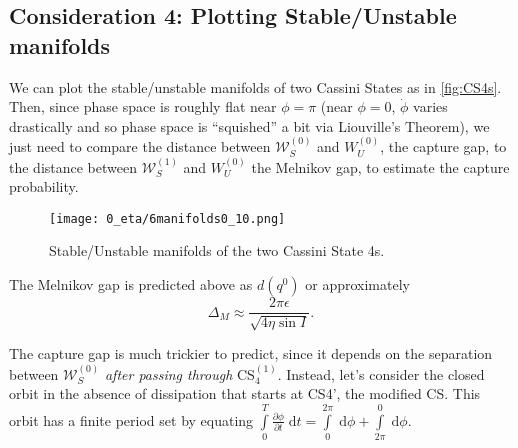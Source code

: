 \documentclass[11pt,
        usenames, %
        dvipsnames %
    ]{article}
\newcommand*{\pd}[2]{\frac{\partial#1}{\partial#2}}
\begin{document}
\subsection{Consideration 4: Plotting Stable/Unstable manifolds}

We can plot the stable/unstable manifolds of two Cassini States as in
\autoref{fig:CS4s}. Then, since phase space is roughly flat near $\phi = \pi$
(near $\phi = 0$, $\dot{\phi}$ varies drastically and so phase space is
``squished'' a bit via Liouville's Theorem), we just need to compare the
distance between $\mathcal{W}^{(0)}_S$ and $W_U^{(0)}$, the capture gap, to the
distance between $\mathcal{W}^{(1)}_S$ and $W_U^{(0)}$ the Melnikov gap, to
estimate the capture probability.
\begin{figure}[t]
    \centering
    \texttt{[image: 0\_eta/6manifolds0\_10.png]}
    \caption{Stable/Unstable manifolds of the two Cassini State
    4s.}\label{fig:CS4s}
\end{figure}

The Melnikov gap is predicted above as $d(q^0)$ or approximately
\begin{equation}
    \Delta_{M} \approx \frac{2\pi \epsilon}{\sqrt{4\eta\sin I}}.
\end{equation}

The capture gap is much trickier to predict, since it depends on the separation
between $\mathcal{W}^{(0)}_S$ \emph{after passing through} CS$_4^{(1)}$.
Instead, let's consider the closed orbit in the absence of dissipation that
starts at CS4', the modified CS\@. This orbit has a finite period set by
equating $\int\limits_0^T \pd{\phi}{t}\;\mathrm{d}t =
\int\limits_0^{2\pi}\;\mathrm{d}\phi + \int\limits_{2\pi}^0\;\mathrm{d}\phi$.
\end{document}
